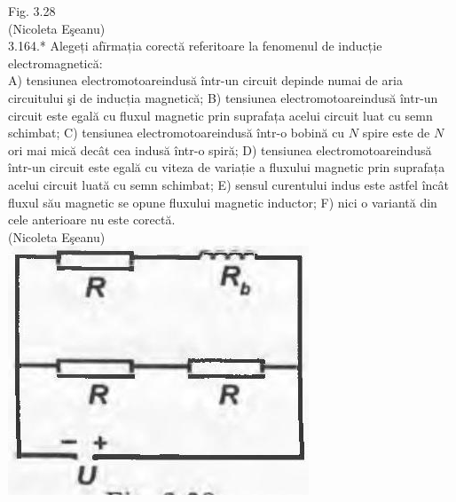 \documentclass[10pt]{article}
\begin{document}
Fig. 3.28\\
(Nicoleta Eşeanu)\\
3.164.* Alegeți afīrmația corectă referitoare la fenomenul de inducție electromagnetică:\\
A) tensiunea electromotoareindusă într-un circuit depinde numai de aria circuitului şi de inducția magnetică; B) tensiunea electromotoareindusă într-un circuit este egală cu fluxul magnetic prin suprafața acelui circuit luat cu semn schimbat; C) tensiunea electromotoareindusă într-o bobină cu $N$ spire este de $N$ ori mai mică decât cea indusă într-o spiră; D) tensiunea electromotoareindusă într-un circuit este egală cu viteza de variație a fluxului magnetic prin suprafața acelui circuit luată cu semn schimbat; E) sensul curentului indus este astfel încât fluxul său magnetic se opune fluxului magnetic inductor; F) nici o variantă din cele anterioare nu este corectă.\\
(Nicoleta Eşeanu)\\
\includegraphics[max width=\textwidth, center]{2025_07_01_5b3ff9fa0d508c8e9f17g-180}
\end{document}
